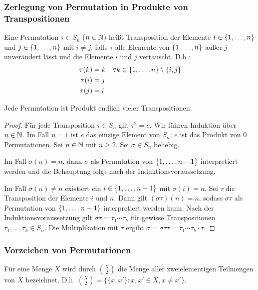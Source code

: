 \subsubsection{Zerlegung von Permutation in Produkte von Transpositionen}

Eine Permutation $ \tau \in S_n $ ($ n \in \mathbb N $) heißt Transposition der Elemente $ i \in \{ 1,\ldots,n \} $ und $ j \in \{ 1,\ldots,n \} $ mit $ i \neq j $, falls $ \tau $ alle Elemente von $ \{ 1,\ldots,n \} $ außer $ j $ unverändert lässt und die Elemente $ i $ und $ j $ vertauscht. D.h.:
\begin{align*}
	\tau(k) &= k \quad \forall k \in \{ 1,\ldots,n \} \setminus \{i,j\} \\
	\tau(i) &= j \\
	\tau(j) &= i
\end{align*}

\begin{propn}
	Jede Permutation ist Produkt endlich vieler Transpositionen.
\end{propn}
\begin{proof}
	Für jede Transposition $ \tau \in S_n $ gilt $ \tau^2 = e $. Wir führen Induktion über $ n \in \mathbb N $. Im Fall $ n = 1 $ ist $ e $ das einzige Element von $ S_n $; $ e $ ist das Produkt von 0 Permutationen. Sei $ n \in \mathbb N $ mit $ n \geq 2 $. Sei $ \sigma \in S_n $ beliebig.
	
	Im Fall $ \sigma(n) = n $, dann $ \sigma $ als Permutation von $ \{ 1,\ldots,n-1 \} $ interpretiert werden und die Behauptung folgt nach der Induktionsvoraussetzung.
	
	Im Fall $ \sigma(n) \neq n $ existiert ein $ i \in \{ 1,\ldots,n-1 \} $ mit $ \sigma(i) = n $. Sei $ \tau $ die Transposition der Elemente $ i $ und $ n $. Dann gilt $ (\sigma\tau)(n) = n $, sodass $ \sigma\tau $ als Permutation von $ \{ 1,\ldots,n-1 \} $ interpretiert werden kann. Nach der Induktionsvoraussetzung gilt $ \sigma\tau = \tau_1 \cdots \tau_k $ für gewisse Transpositionen $ \tau_1, \ldots, \tau_k \in S_n $. Die Multiplikation mit $ \tau $ ergibt $ \sigma = \sigma\tau\tau = \tau_1 \cdots \tau_k \cdot \tau $.
\end{proof}

\subsubsection{Vorzeichen von Permutationen}

Für eine Menge $ X $ wird durch $ \binom{X}{2} $ die Menge aller zweielementigen Teilmengen von $ X $ bezeichnet. D.h. $ \binom{X}{2} = \{ \{x,x'\} : x,x' \in X, x \neq x' \} $.


